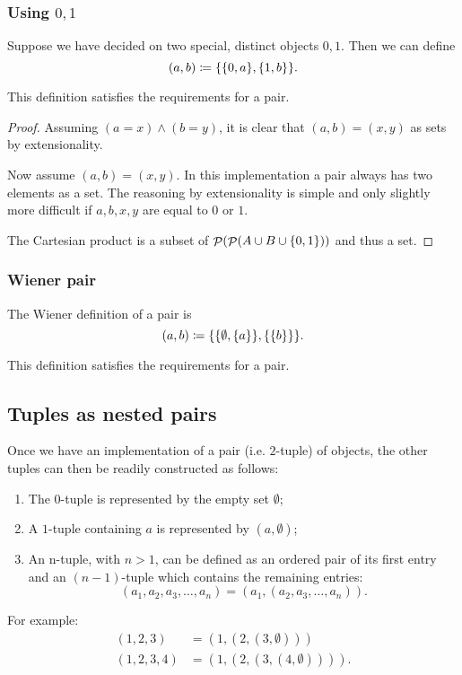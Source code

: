 \subsubsection{Using $0,1$}
Suppose we have decided on two special, distinct objects $0,1$. Then we can define
\[ (a,b) \coloneqq \{\{0,a\},\{1,b\}\}. \]
\begin{proposition}
This definition satisfies the requirements for a pair.
\end{proposition}
\begin{proof}
Assuming $(a=x)\land (b=y)$, it is clear that $(a,b)=(x,y)$ as sets by extensionality.

Now assume $(a,b)=(x,y)$. In this implementation a pair always has two elements as a set. The reasoning by extensionality is simple and only slightly more difficult if $a,b,x,y$ are equal to $0$ or $1$.

The Cartesian product is a subset of $\mathop{\mathcal{P}}(\mathop{\mathcal{P}}(A\cup B\cup \{0,1\}))$ and thus a set.
\end{proof}
\subsubsection{Wiener pair}
The Wiener definition of a pair is
\[ (a,b) \coloneqq \{\{\emptyset,\{a\}\},\{\{b\}\}\}. \]
\begin{proposition}
This definition satisfies the requirements for a pair.
\end{proposition}

\subsection{Tuples as nested pairs}
Once we have an implementation of a pair (i.e. $2$-tuple) of objects, the other tuples can then be readily constructed as follows:
\begin{enumerate}
\item The $0$-tuple is represented by the empty set $\emptyset$;
\item A $1$-tuple containing $a$ is represented by $(a,\emptyset)$;
\item An n-tuple, with $n > 1$, can be defined as an ordered pair of its first entry and an $(n − 1)$-tuple which contains the remaining entries:
\[ (a_1,a_2,a_3,\ldots,a_n) = (a_1, (a_2,a_3,\ldots, a_n)). \]
\end{enumerate}
For example:
\begin{align*}
(1,2,3) &= (1,(2,(3,\emptyset))) \\
(1,2,3,4) &= (1,(2,(3,(4,\emptyset)))).
\end{align*}

